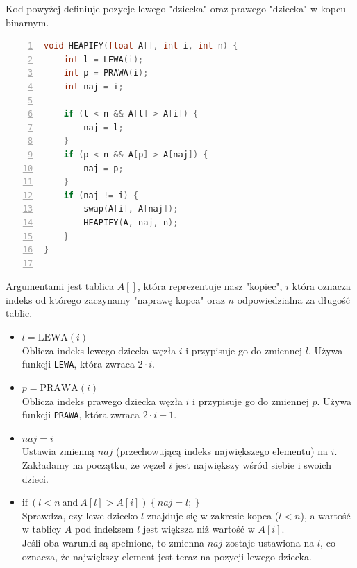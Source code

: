 \documentclass{article}
\begin{document}
\large{Kod powyżej definiuje pozycje lewego "dziecka" oraz prawego "dziecka" w kopcu binarnym.}

\begin{lstlisting}[language=C++, caption={Fragment 1 funkcji sortującej przez kopcowanie bez modyfikacji}, numbers=left, frame=single, xleftmargin=20pt, xrightmargin = 1pt]
void HEAPIFY(float A[], int i, int n) {
	int l = LEWA(i);
	int p = PRAWA(i);
	int naj = i;
		
	if (l < n && A[l] > A[i]) {
		naj = l;
	}
	if (p < n && A[p] > A[naj]) {
		naj = p;
	}
	if (naj != i) {
		swap(A[i], A[naj]);
		HEAPIFY(A, naj, n);
	}
}
	
\end{lstlisting}

\large{Argumentami jest tablica \(A[]\), która reprezentuje nasz "kopiec", \(i\) która oznacza indeks od którego zaczynamy "naprawę kopca" oraz \(n\) odpowiedzialna za długość tablic.}

\begin{itemize}
	\item $l = \text{LEWA}(i)$ \\
	Oblicza indeks lewego dziecka węzła $i$ i przypisuje go do zmiennej $l$. Używa funkcji \texttt{LEWA}, która zwraca $2 \cdot i$.
	
	\item $p = \text{PRAWA}(i)$ \\
	Oblicza indeks prawego dziecka węzła $i$ i przypisuje go do zmiennej $p$. Używa funkcji \texttt{PRAWA}, która zwraca $2 \cdot i + 1$.
	
	\item $naj = i$ \\
	Ustawia zmienną $naj$ (przechowującą indeks największego elementu) na $i$. Zakładamy na początku, że węzeł $i$ jest największy wśród siebie i swoich dzieci.
\end{itemize}

\begin{itemize}
\item $ \text{if} \ (l < n \ \text{and} \ A[l] > A[i]) \ {\{} \ naj = l; \ {\}}$ \\
Sprawdza, czy lewe dziecko $l$ znajduje się w zakresie kopca ($l < n$), a wartość w tablicy $A$ pod indeksem $l$ jest większa niż wartość w $A[i]$. \\
Jeśli oba warunki są spełnione, to zmienna $naj$ zostaje ustawiona na $l$, co oznacza, że największy element jest teraz na pozycji lewego dziecka.
\end{itemize}
\end{document}
